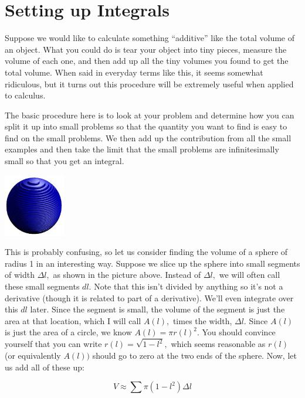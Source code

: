 \documentclass[12pt]{book}
\begin{document}
\pagebreak

\section{Setting up Integrals}

\noindent Suppose we would like to calculate something ``additive'' like the total volume of an object. What you could do is tear your object into tiny pieces, measure the volume of each one, and then add up all the tiny volumes you found to get the total volume. When said in everyday terms like this, it seems somewhat ridiculous, but it turns out this procedure will be extremely useful when applied to calculus.

 The basic procedure here is to look at your problem and determine how you can split it up into small problems so that the quantity you want to find is easy to find on the small problems. We then add up the contribution from all the small examples and then take the limit that the small problems are infinitesimally small so that you get an integral.

\begin{center}
\includegraphics[width=0.2\textwidth]{paste_image3.jpg}
\end{center}

 This is probably confusing, so let us consider finding the volume of a sphere of radius 1 in an interesting way. Suppose we slice up the sphere into small segments of width $\Delta l,$ as shown in the picture above. Instead of $\Delta l,$ we will often call these small segments $dl.$ Note that this isn't divided by anything so it's not a derivative (though it is related to part of a derivative). We'll even integrate over this $dl$ later. Since the segment is small, the volume of the segment is just the area at that location, which I will call $A(l),$ times the width, $\Delta l.$ Since $A(l)$ is just the area of a circle, we know $A(l) = \pi r(l)^2.$ You should convince yourself that you can write $r(l) = \sqrt{1-l^2},$ which seems reasonable as $r(l)$ (or equivalently $A(l))$ should go to zero at the two ends of the sphere. Now, let us add all of these up:

\begin{equation*}
 V \approx \sum \pi(1-l^2) \Delta l
\end{equation*}
\end{document}
